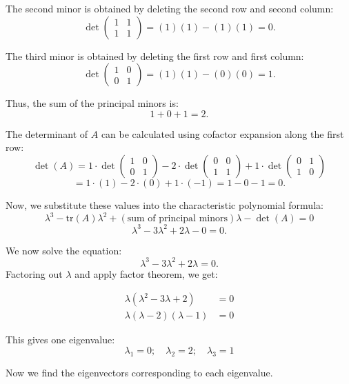 \documentclass[
  letterpaper,
  DIV=11,
  numbers=noendperiod]{scrreprt}
\theoremstyle{plain}
\theoremstyle{definition}
\theoremstyle{remark}
\begin{document}
The second minor is obtained by deleting the second row and second
column: \[
\det\begin{pmatrix} 1 & 1 \\ 1 & 1 \end{pmatrix} = (1)(1) - (1)(1) = 0.
\]

The third minor is obtained by deleting the first row and first column:
\[
\det\begin{pmatrix} 1 & 0 \\ 0 & 1 \end{pmatrix} = (1)(1) - (0)(0) = 1.
\]

Thus, the sum of the principal minors is: \[
1 + 0 + 1 = 2.
\]

The determinant of \(A\) can be calculated using cofactor expansion
along the first row: \[
\det(A) = 1 \cdot \det\begin{pmatrix} 1 & 0 \\ 0 & 1 \end{pmatrix} - 2 \cdot \det\begin{pmatrix} 0 & 0 \\ 1 & 1 \end{pmatrix} + 1 \cdot \det\begin{pmatrix} 0 & 1 \\ 1 & 0 \end{pmatrix}
\] \[
= 1 \cdot (1) - 2 \cdot (0) + 1 \cdot (-1) = 1 - 0 - 1 = 0.
\]

Now, we substitute these values into the characteristic polynomial
formula: \[
\lambda^3 - \text{tr}(A)\lambda^2 + (\text{sum of principal minors})\lambda - \det(A) = 0
\] \[
\lambda^3 - 3\lambda^2 + 2\lambda - 0 = 0.
\]

We now solve the equation: \[
\lambda^3 - 3\lambda^2 + 2\lambda = 0.
\] Factoring out \(\lambda\) and apply factor theorem, we get:

\begin{align*}
   \lambda(\lambda^2 - 3\lambda + 2) &= 0\\
   \lambda(\lambda-2)(\lambda-1)&=0
\end{align*}

This gives one eigenvalue: \[
\lambda_1 = 0;\quad \lambda_2=2;\quad \lambda_3=1
\]

Now we find the eigenvectors corresponding to each eigenvalue.
\end{document}
